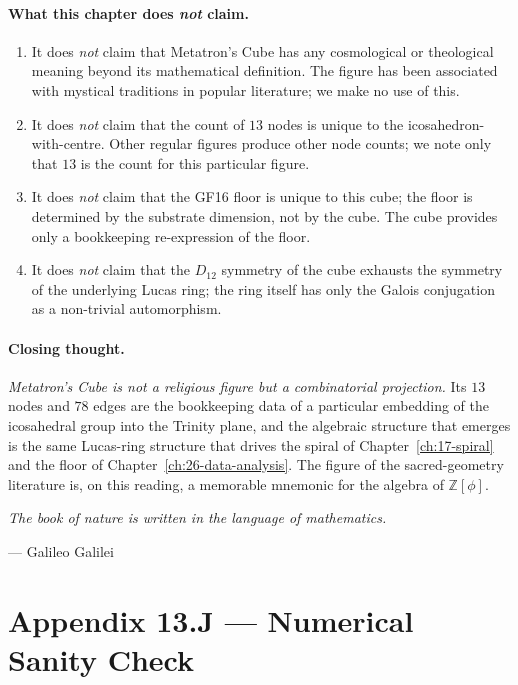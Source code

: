 \paragraph{What this chapter does \emph{not} claim.}

\begin{enumerate}
\item It does \emph{not} claim that Metatron's Cube has any
  cosmological or theological meaning beyond its mathematical
  definition. The figure has been associated with mystical
  traditions in popular literature; we make no use of this.
\item It does \emph{not} claim that the count of $13$ nodes is
  unique to the icosahedron-with-centre. Other regular figures
  produce other node counts; we note only that $13$ is the count
  for this particular figure.
\item It does \emph{not} claim that the GF16 floor is unique to
  this cube; the floor is determined by the substrate dimension,
  not by the cube. The cube provides only a bookkeeping
  re-expression of the floor.
\item It does \emph{not} claim that the $D_{12}$ symmetry of the
  cube exhausts the symmetry of the underlying Lucas ring; the
  ring itself has only the Galois conjugation as a non-trivial
  automorphism.
\end{enumerate}

\paragraph{Closing thought.}
\emph{Metatron's Cube is not a religious figure but a combinatorial
projection.} Its $13$ nodes and $78$ edges are the bookkeeping data
of a particular embedding of the icosahedral group into the Trinity
plane, and the algebraic structure that emerges is the same
Lucas-ring structure that drives the spiral of
Chapter~\ref{ch:17-spiral} and the floor of
Chapter~\ref{ch:26-data-analysis}. The figure of the
sacred-geometry literature is, on this reading, a memorable mnemonic
for the algebra of $\mathbb{Z}[\phi]$.

\begin{flushright}
\textit{The book of nature is written in the language of mathematics.}\par
\hfill --- Galileo Galilei
\end{flushright}

\section*{Appendix 13.J --- Numerical Sanity Check}
\label{fa_13:sec:13-appJ}


